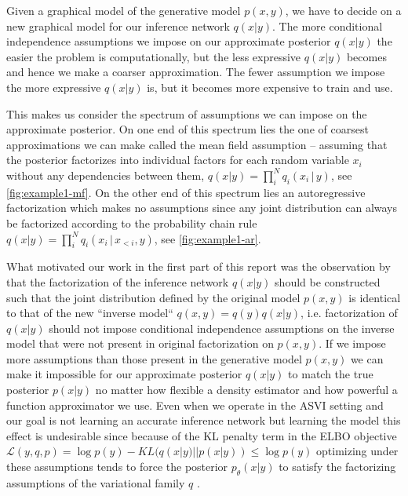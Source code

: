 \documentclass[12pt]{article}
\begin{document}
Given a graphical model of the generative model $p(x,y)$, 
we have to decide on a new graphical model for our inference network $q(x|y)$. 
The more conditional independence assumptions we impose on our approximate posterior $q(x|y)$ the easier the problem is computationally, but the less expressive $q(x|y)$ becomes and hence we make a coarser approximation.
The fewer assumption we impose the more expressive $q(x|y)$ is, but it becomes more expensive to train and use.

This makes us consider the spectrum of assumptions we can impose on the approximate posterior.
On one end of this spectrum lies the one of coarsest approximations we can make called the mean field assumption -- assuming that the posterior factorizes into individual factors for each random variable $x_i$ without any dependencies between them, $q(x|y)=\prod^N_iq_i(x_i\,|\,y)$, see \autoref{fig:example1-mf}.
On the other end of this spectrum lies an autoregressive factorization which makes no assumptions since any joint distribution can always be factorized according to the probability chain rule $q(x|y)=\prod^N_iq_i(x_i\,|\,x_{<i},y)$, see \autoref{fig:example1-ar}.

What motivated our work in the first part of this report was the observation by \citet{StuhlmullerEtAl2013} that
the factorization of the inference network $q(x|y)$ should be constructed such that the joint distribution defined by the original model $p(x, y)$ is identical to that of the new ``inverse model`` $q(x, y) = q(y)q(x|y)$, i.e. factorization of $q(x|y)$ should not impose conditional independence assumptions on the inverse model that were not present in original factorization on $p(x,y)$.
If we impose more assumptions than those present in the generative model $p(x,y)$ we can make it impossible for our approximate posterior $q(x|y)$ to match the true posterior $p(x|y)$ no matter how flexible a density estimator and how powerful a function approximator we use.
Even when we operate in the ASVI setting and our goal is not learning an accurate inference network but learning the model this effect is undesirable
since because of the KL penalty term in the ELBO objective
$\mathcal{L}(y,q,p)=\log p(y)-KL(q(x|y) || p(x|y)) \le \log p(y)$ \citep{VAE}
optimizing under these assumptions tends to force the posterior $p_\theta(x|y)$ to satisfy the factorizing assumptions of the variational family $q$ \citep{FIVO}.
\end{document}
